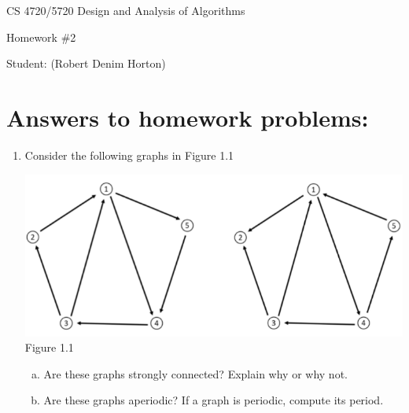 \documentclass[11pt]{article}
\begin{document}
 

\rhead{\today}

\begin{center}\begin{Large}
CS 4720/5720 Design and Analysis of Algorithms

Homework \#2

Student: (Robert Denim Horton)
\end{Large}
\end{center}


\section*{Answers to homework problems:}

\begin{enumerate}
	\item Consider the following graphs in Figure 1.1
	\begin{center}
		\includegraphics[scale=0.6]{Question1_Figure1.1}\\
		Figure 1.1
	\end{center}
	\begin{enumerate}[(a)]
			\item Are these graphs strongly connected? Explain why or why not.
			\item Are these graphs aperiodic? If a graph is periodic, compute its period.
		\end{enumerate}
\end{enumerate}
\end{document}

